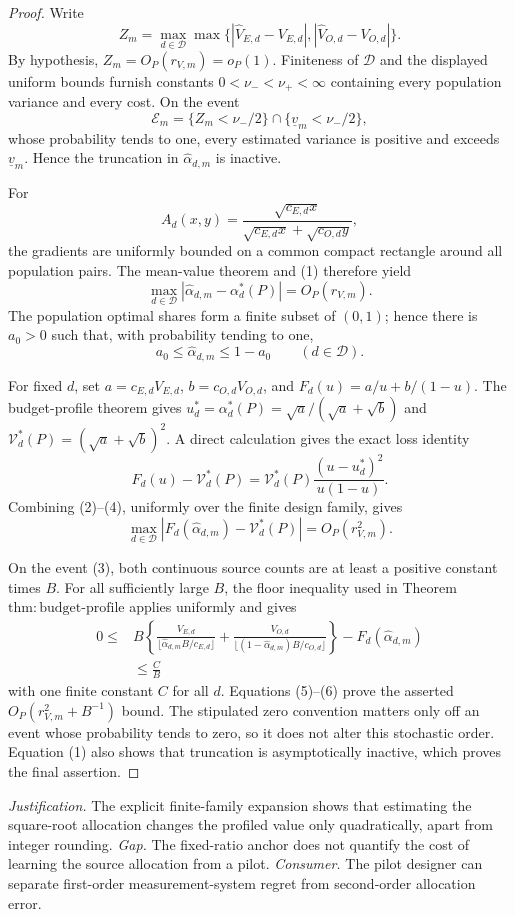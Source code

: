 \documentclass{article}
\begin{document}
\begin{proof}
Write
\[
 Z_m=\max_{d\in\mathcal D}\max\{|\widehat V_{E,d}-V_{E,d}|,
 |\widehat V_{O,d}-V_{O,d}|\}.
\]
By hypothesis, \(Z_m=O_P(r_{V,m})=o_P(1)\).  Finiteness of \(\mathcal D\) and the displayed uniform bounds furnish constants \(0<\nu_-<\nu_+<\infty\) containing every population variance and every cost.  On the event
\[
 \mathcal E_m=\{Z_m<\nu_-/2\}\cap\{\underline v_m<\nu_-/2\}, \tag{1}
\]
whose probability tends to one, every estimated variance is positive and exceeds \(\underline v_m\).  Hence the truncation in \(\widehat\alpha_{d,m}\) is inactive.

For
\[
 A_d(x,y)=\frac{\sqrt{c_{E,d}x}}
 {\sqrt{c_{E,d}x}+\sqrt{c_{O,d}y}},
\]
the gradients are uniformly bounded on a common compact rectangle around all population pairs.  The mean-value theorem and (1) therefore yield
\[
 \max_{d\in\mathcal D}|\widehat\alpha_{d,m}-\alpha_d^*(P)|
 =O_P(r_{V,m}). \tag{2}
\]
The population optimal shares form a finite subset of \((0,1)\); hence there is \(a_0>0\) such that, with probability tending to one,
\[
 a_0\le\widehat\alpha_{d,m}\le1-a_0
 \qquad(d\in\mathcal D). \tag{3}
\]

For fixed \(d\), set \(a=c_{E,d}V_{E,d}\), \(b=c_{O,d}V_{O,d}\), and \(F_d(u)=a/u+b/(1-u)\).  The budget-profile theorem gives \(u_d^*=\alpha_d^*(P)=\sqrt a/(\sqrt a+\sqrt b)\) and \(\mathcal V_d^*(P)=(\sqrt a+\sqrt b)^2\).  A direct calculation gives the exact loss identity
\[
 F_d(u)-\mathcal V_d^*(P)
 =\mathcal V_d^*(P)\frac{(u-u_d^*)^2}{u(1-u)}. \tag{4}
\]
Combining (2)--(4), uniformly over the finite design family, gives
\[
 \max_{d\in\mathcal D}
 |F_d(\widehat\alpha_{d,m})-\mathcal V_d^*(P)|
 =O_P(r_{V,m}^2). \tag{5}
\]

On the event (3), both continuous source counts are at least a positive constant times \(B\).  For all sufficiently large \(B\), the floor inequality used in Theorem~\(\mathrm{thm{:}budget\text{-}profile}\) applies uniformly and gives
\[
\begin{aligned}
 0\le{}&B\left\{
 \frac{V_{E,d}}{\lfloor\widehat\alpha_{d,m}B/c_{E,d}\rfloor}
 +\frac{V_{O,d}}{\lfloor(1-\widehat\alpha_{d,m})B/c_{O,d}\rfloor}
 \right\}-F_d(\widehat\alpha_{d,m})\\
 &\le\frac{C}{B}
\end{aligned} \tag{6}
\]
with one finite constant \(C\) for all \(d\).  Equations (5)--(6) prove the asserted \(O_P(r_{V,m}^2+B^{-1})\) bound.  The stipulated zero convention matters only off an event whose probability tends to zero, so it does not alter this stochastic order.  Equation (1) also shows that truncation is asymptotically inactive, which proves the final assertion.
\end{proof}
\par\smallskip\noindent \textit{Justification.} The explicit finite-family expansion shows that estimating the square-root allocation changes the profiled value only quadratically, apart from integer rounding. \textit{Gap.} The fixed-ratio anchor does not quantify the cost of learning the source allocation from a pilot. \textit{Consumer.} The pilot designer can separate first-order measurement-system regret from second-order allocation error.
\end{document}
